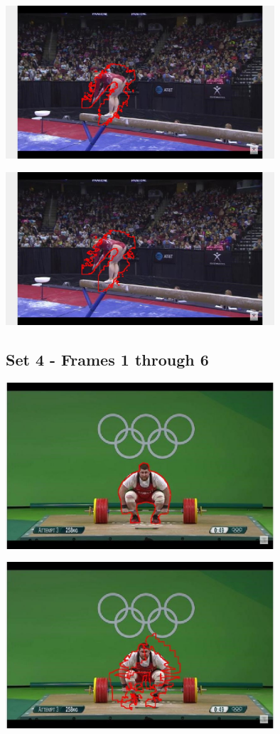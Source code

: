 \documentclass{article}
\begin{document}
	\begin{center}
		\includegraphics[width=100mm]{img/c5}
	\end{center}
	
	\begin{center}
		\includegraphics[width=100mm]{img/c6}
	\end{center}

	\subsection{Set 4 - Frames 1 through 6}
	
	\begin{center}
		\includegraphics[width=100mm]{img/d1}
	\end{center}
	
	\begin{center}
		\includegraphics[width=100mm]{img/d2}
	\end{center}
	
\end{document}

